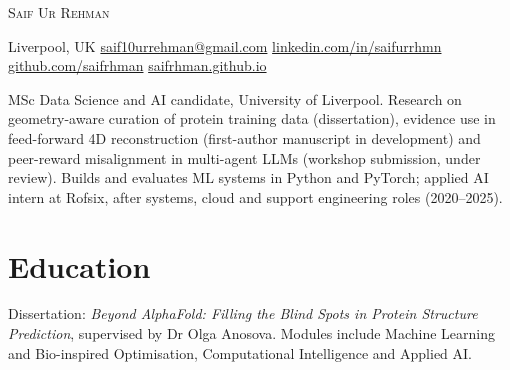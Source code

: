 \documentclass[10pt]{article}
\begin{document}
{\centering
{\LARGE\scshape Saif Ur Rehman}\par\vspace{0.6ex}
{\small Liverpool, UK \enspace\textbullet\enspace
\href{mailto:saif10urrehman@gmail.com}{saif10urrehman@gmail.com} \enspace\textbullet\enspace
\href{https://www.linkedin.com/in/saifurrhmn/}{linkedin.com/in/saifurrhmn} \enspace\textbullet\enspace
\href{https://github.com/saifrhman}{github.com/saifrhman} \enspace\textbullet\enspace
\href{https://saifrhman.github.io}{saifrhman.github.io}}\par}

\vspace{1.2ex}
MSc Data Science and AI candidate, University of Liverpool. Research on geometry-aware curation of protein training
data (dissertation), evidence use in feed-forward 4D reconstruction (first-author manuscript in development) and
peer-reward misalignment in multi-agent LLMs (workshop submission, under review). Builds and evaluates ML systems in
Python and PyTorch; applied AI intern at Rofsix, after systems, cloud and support engineering roles (2020--2025).

\section{Education}
Dissertation: \emph{Beyond AlphaFold: Filling the Blind Spots in Protein Structure Prediction}, supervised by
Dr Olga Anosova. Modules include Machine Learning and Bio-inspired Optimisation, Computational Intelligence and
Applied AI.
\gap
{}
\end{document}
